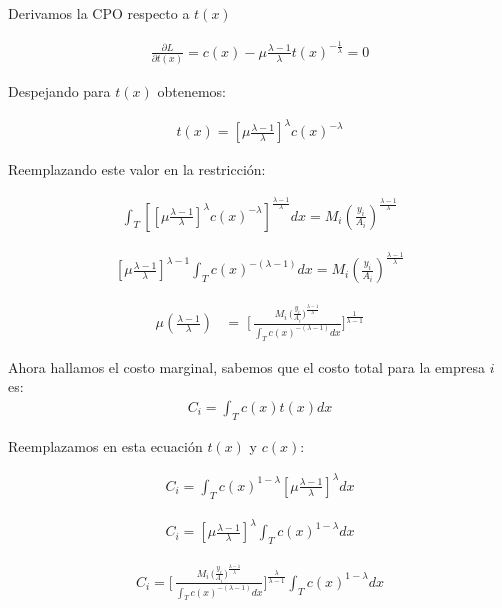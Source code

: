 \documentclass{article}
\theoremstyle{remark}
\theoremstyle{definition}
\begin{document}
Derivamos la CPO respecto a $t(x)$

\begin{align*}
    \frac{\partial L}{\partial t(x)} = c(x)-\mu \frac{\lambda -1}{\lambda}t(x)^{-\frac{1}{\lambda}} =0
\end{align*}

Despejando para $t(x)$ obtenemos:

\begin{align*}
    t(x) = \left[\mu\frac{\lambda-1}{\lambda}\right]^{\lambda}c(x)^{-\lambda}
\end{align*}

Reemplazando este valor en la restricci\'on:

\begin{align*}
\int_{T}\left[\left[\mu\frac{\lambda-1}{\lambda}\right]^{\lambda}c(x)^{-\lambda}\right]^{\frac{\lambda -1}{\lambda}}dx = M_i \left(\frac{y_i}{A_i}\right)^{\frac{\lambda-1}{\lambda}}
\end{align*}

\begin{align*}
\left[\mu\frac{\lambda-1}{\lambda}\right]^{\lambda-1}\int_{T}c(x)^{-(\lambda-1)}dx = M_i \left(\frac{y_i}{A_i}\right)^{\frac{\lambda-1}{\lambda}}
\end{align*}

\begin{align*}
\mu \left(\frac{\lambda-1}{\lambda}\right)
&= 
\;\Biggl[\,
\frac{M_i \,\bigl(\frac{y_i}{A_i}\bigr)^{\frac{\lambda-1}{\lambda}}}
     {\int_{T}c(x)^{-(\lambda-1)}dx}
\Biggr]^{\frac{1}{\lambda-1}}
\end{align*}

Ahora hallamos el costo marginal, sabemos que el costo total para la empresa $i$ es:
\begin{align*}
    C_i=\int_T c(x)t(x)dx
\end{align*}

Reemplazamos en esta ecuaci\'on $t(x)$ y $c(x)$:

\begin{align*}
    C_i=\int_T c(x)^{1-\lambda}\left[\mu\frac{\lambda-1}{\lambda}\right]^{\lambda}dx
\end{align*}

\begin{align*}
    C_i=\left[\mu\frac{\lambda-1}{\lambda}\right]^{\lambda}\int_T c(x)^{1-\lambda}dx
\end{align*}

\begin{align*}
    C_i=\Biggl[\,
\frac{M_i \,\bigl(\frac{y_i}{A_i}\bigr)^{\frac{\lambda-1}{\lambda}}}
     {\int_{T}c(x)^{-(\lambda-1)}dx}
\Biggr]^{\frac{\lambda}{\lambda-1}}\int_T c(x)^{1-\lambda}dx
\end{align*}
\end{document}

